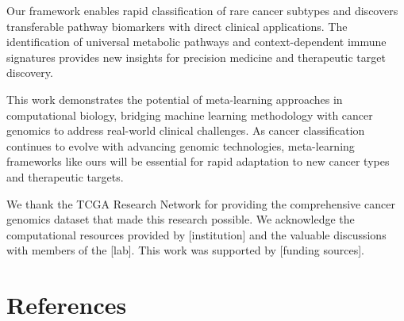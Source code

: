 \documentclass{article}
\begin{document}
Our framework enables rapid classification of rare cancer subtypes and discovers transferable pathway biomarkers with direct clinical applications. The identification of universal metabolic pathways and context-dependent immune signatures provides new insights for precision medicine and therapeutic target discovery.

This work demonstrates the potential of meta-learning approaches in computational biology, bridging machine learning methodology with cancer genomics to address real-world clinical challenges. As cancer classification continues to evolve with advancing genomic technologies, meta-learning frameworks like ours will be essential for rapid adaptation to new cancer types and therapeutic targets.

\begin{ack}
We thank the TCGA Research Network for providing the comprehensive cancer genomics dataset that made this research possible. We acknowledge the computational resources provided by [institution] and the valuable discussions with members of the [lab]. This work was supported by [funding sources].
\end{ack}

\section*{References}
\end{document}
